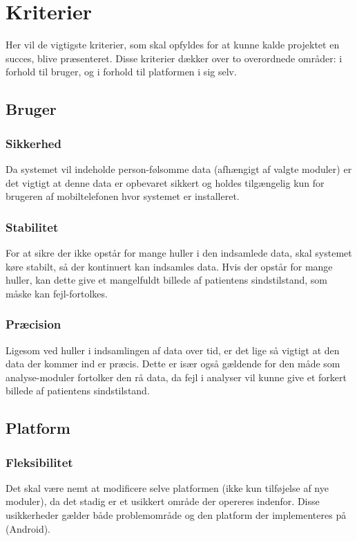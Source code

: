 \section{Kriterier}
Her vil de vigtigste kriterier, som skal opfyldes for at kunne kalde projektet en succes, blive præsenteret.
Disse kriterier dækker over to overordnede områder: i forhold til bruger, og i forhold til platformen i sig selv.

\subsection{Bruger}

\subsubsection{Sikkerhed}
Da systemet vil indeholde person-følsomme data (afhængigt af valgte moduler) er det vigtigt at denne data er opbevaret sikkert og holdes tilgængelig kun for brugeren af mobiltelefonen hvor systemet er installeret.

\subsubsection{Stabilitet}
For at sikre der ikke opstår for mange huller i den indsamlede data, skal systemet køre stabilt, så der kontinuert kan indsamles data.
Hvis der opstår for mange huller, kan dette give et mangelfuldt billede af patientens sindstilstand, som måske kan fejl-fortolkes.

\subsubsection{Præcision}
Ligesom ved huller i indsamlingen af data over tid, er det lige så vigtigt at den data der kommer ind er præcis.
Dette er især også gældende for den måde som analyse-moduler fortolker den rå data, da fejl i analyser vil kunne give et forkert billede af patientens sindstilstand.

\subsection{Platform}

\subsubsection{Fleksibilitet}
Det skal være nemt at modificere selve platformen (ikke kun tilføjelse af nye moduler), da det stadig er et usikkert område der opereres indenfor.
Disse usikkerheder gælder både problemområde og den platform der implementeres på (Android).

